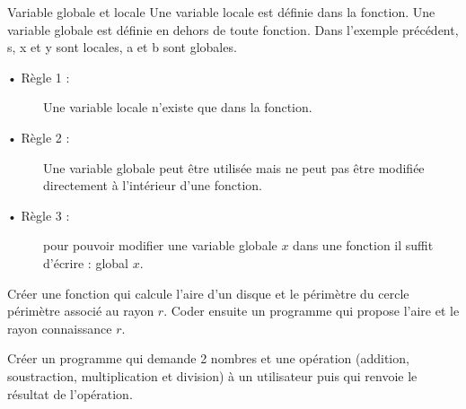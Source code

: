 \begin{DefT}{Variable globale et locale}
  Une variable locale est définie dans la fonction. 
    Une variable globale est définie en dehors de toute fonction. Dans l'exemple précédent, s, x et y sont locales, a et  b sont globales.
  \begin{description}
  
  \item[• Règle 1 :]   Une variable locale n'existe que dans la fonction.
  
   \item[• Règle 2 :] Une variable globale peut être utilisée mais ne peut pas être modifiée directement à l'intérieur d'une fonction.
  
   \item[• Règle 3 :] pour pouvoir modifier une variable globale $x$ dans une fonction il suffit d'écrire : global $x$.
\end{description}
\end{DefT}

\begin{ExD} 

Créer une fonction qui calcule l'aire d'un disque et le périmètre du cercle périmètre associé au rayon $r$. Coder ensuite un programme qui propose l'aire et le rayon connaissance $r$.
\end{ExD}



\begin{ExD} 

Créer un programme qui demande 2 nombres et une opération (addition, soustraction, multiplication et division)  à un utilisateur puis qui renvoie le résultat de l'opération. 
\end{ExD}

\newpage

\begin{titre}

\end{titre}


